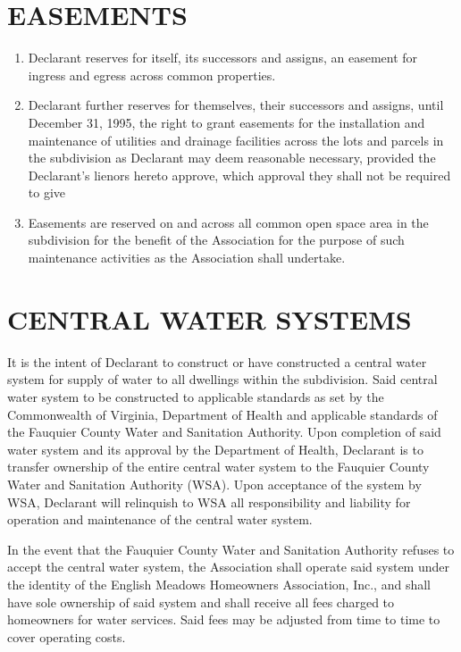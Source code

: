 \documentclass[10pt, letterpaper]{article}
\begin{document}
\section{EASEMENTS}
\begin{enumerate}
  \item Declarant reserves for itself, its successors and assigns, an easement for ingress and egress across common properties.
  \item Declarant further reserves for themselves, their successors and assigns, until December 31, 1995, the right to grant easements for the installation and maintenance of utilities and drainage facilities across the lots and parcels in the subdivision as Declarant may deem reasonable necessary, provided the Declarant's lienors hereto approve, which approval they shall not be required to give
  \item Easements are reserved on and across all common open space area in the subdivision for the benefit of the Association for the purpose of such maintenance activities as the Association shall undertake.
\end{enumerate}

\section{CENTRAL WATER SYSTEMS}
It is the intent of Declarant to construct or have constructed a central water system for supply of water to all dwellings within the subdivision.
Said central water system to be constructed to applicable standards as set by the Commonwealth of Virginia, Department of Health and applicable standards of the Fauquier County Water and Sanitation Authority.
Upon completion of said water system and its approval by the Department of Health, Declarant is to transfer ownership of the entire central water system to the Fauquier County Water and Sanitation Authority (WSA).
Upon acceptance of the system by WSA, Declarant will relinquish to WSA all responsibility and liability for operation and maintenance of the central water system.

In the event that the Fauquier County Water and Sanitation Authority refuses to accept the central water system, the Association shall operate said system under the identity of the English Meadows Homeowners Association, Inc., and shall have sole ownership of said system and shall receive all fees charged to homeowners for water services.
Said fees may be adjusted from time to time to cover operating costs.
\end{document}
